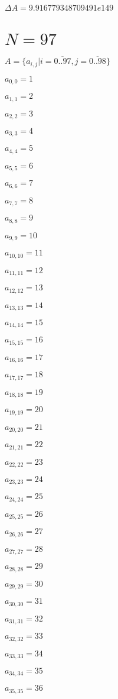 \documentclass[a4paper,12pt]{article}
\begin{document}
$\Delta A = 9.916779348709491e149$



\section{ $N = 97$ }
$A = \{ a _{ i, j } | i = \overline { 0..97 }, j = \overline { 0..98 } \}$

$a _{ 0, 0 } = 1$

$a _{ 1, 1 } = 2$

$a _{ 2, 2 } = 3$

$a _{ 3, 3 } = 4$

$a _{ 4, 4 } = 5$

$a _{ 5, 5 } = 6$

$a _{ 6, 6 } = 7$

$a _{ 7, 7 } = 8$

$a _{ 8, 8 } = 9$

$a _{ 9, 9 } = 10$

$a _{ 10, 10 } = 11$

$a _{ 11, 11 } = 12$

$a _{ 12, 12 } = 13$

$a _{ 13, 13 } = 14$

$a _{ 14, 14 } = 15$

$a _{ 15, 15 } = 16$

$a _{ 16, 16 } = 17$

$a _{ 17, 17 } = 18$

$a _{ 18, 18 } = 19$

$a _{ 19, 19 } = 20$

$a _{ 20, 20 } = 21$

$a _{ 21, 21 } = 22$

$a _{ 22, 22 } = 23$

$a _{ 23, 23 } = 24$

$a _{ 24, 24 } = 25$

$a _{ 25, 25 } = 26$

$a _{ 26, 26 } = 27$

$a _{ 27, 27 } = 28$

$a _{ 28, 28 } = 29$

$a _{ 29, 29 } = 30$

$a _{ 30, 30 } = 31$

$a _{ 31, 31 } = 32$

$a _{ 32, 32 } = 33$

$a _{ 33, 33 } = 34$

$a _{ 34, 34 } = 35$

$a _{ 35, 35 } = 36$
\end{document}
